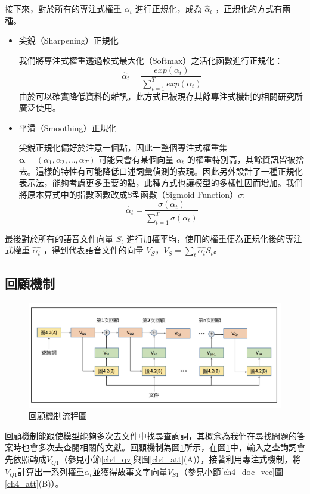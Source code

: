 接下來，對於所有的專注式權重 $\alpha_t$ 進行正規化，成為
$\hat{\alpha}_t$ ，正規化的方式有兩種。
\begin{itemize}
	\item{尖銳（Sharpening）正規化}
		
		我們將專注式權重透過軟式最大化（Softmax）之活化函數進行正規化：
		\begin{equation}
			\hat{\alpha}_t =
			\frac{exp(\alpha_t)}{\sum_{t=1}^{T} exp(\alpha_t)}
		\end{equation}
		由於可以確實降低資料的雜訊，此方式已被現存其餘專注式機制的相關研究所廣泛使用。
	\item{平滑（Smoothing）正規化}
		
		尖銳正規化偏好於注意一個點，因此一整個專注式權重集 $
		\boldsymbol{\alpha}
		= (\alpha_1,\alpha_2, ...,
		\alpha_T)$
		可能只會有某個向量 $\alpha_t$ 的權重特別高，其餘資訊皆被捨去。這樣的特性有可能降低口述詞彙偵測的表現。因此另外設計了一種正規化表示法，能夠考慮更多重要的點，此種方式也讓模型的多樣性因而增加。我們將原本算式中的指數函數改成S型函數（Sigmoid Function）$\sigma$:
		\begin{equation}
			\hat{\alpha}_t =
			\frac{\sigma(\alpha_t)}{\sum_{t=1}^{T}\sigma(\alpha_t)}
		\end{equation}

\end{itemize}
最後對於所有的語音文件向量 $S_t$
進行加權平均，使用的權重便為正規化後的專注式權重 $\hat{\alpha_t}$
，得到代表語音文件的向量 $V_S$，$V_S
= \sum_{t} \hat{\alpha_t} S_t$。
\label{ch4_doc_vec}
\subsection{回顧機制}
\begin{figure}
\centering
\includegraphics[scale=0.7]{images/ch4_hop.png} 
\caption{回顧機制流程圖}
\label{ch4_hop}
\end{figure}
回顧機制能跟使模型能夠多次去文件中找尋查詢詞，其概念為我們在尋找問題的答案時也會多次去查閱相關的文獻。回顧機制為圖\ref{ch4_hop}所示，在圖\ref{ch4_hop}中，輸入之查詢詞會先依照轉成$V_{Q1}$（參見小節\ref{ch4_qv}與圖\ref{ch4_att}(A)），接著利用專注式機制，將$V_{Q1}$計算出一系列權重$α_t$並獲得故事文字向量$V_{S1}$（參見小節\ref{ch4_doc_vec}圖\ref{ch4_att}(B)）。


